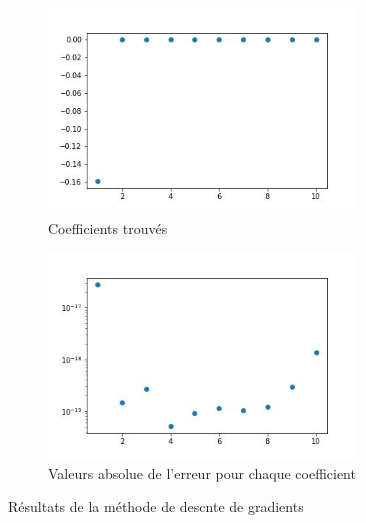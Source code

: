 \documentclass[12pt]{report}
\begin{document}
\begin{figure}
    \centering
    \begin{subfigure}[b]{0.4\textwidth}
        \centering
        \includegraphics[width=0.9\textwidth, height=0.9\textwidth]{coefs_1_DG.jpg}
        \caption{Coefficients trouvés}
    \end{subfigure}
    \hfill
    \begin{subfigure}[b]{0.4\textwidth}
        \centering
        \includegraphics[width=0.9\textwidth, height=0.9\textwidth]{coefs_1_DG_erreur.jpg}
        \caption{Valeurs absolue de l'erreur pour chaque coefficient}
    \end{subfigure}
    \caption{Résultats de la méthode de descnte de gradients}
    \label{fig:resultats1DG}
\end{figure}
\end{document}
